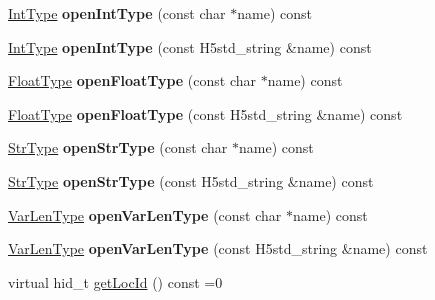 \begin{DoxyCompactItemize}
\item 
\mbox{\label{class_h5_1_1_common_f_g_a8840cb7af2ee07b9957fdfe2e9bb69e6}} 
\hyperlink{class_h5_1_1_int_type}{Int\+Type} {\bfseries open\+Int\+Type} (const char $\ast$name) const
\item 
\mbox{\label{class_h5_1_1_common_f_g_a3b5b0f0cbd4c3c19e1c42ab602c0620c}} 
\hyperlink{class_h5_1_1_int_type}{Int\+Type} {\bfseries open\+Int\+Type} (const H5std\+\_\+string \&name) const
\item 
\mbox{\label{class_h5_1_1_common_f_g_a4ff5671504f7a61a3104a3bdf765a6e4}} 
\hyperlink{class_h5_1_1_float_type}{Float\+Type} {\bfseries open\+Float\+Type} (const char $\ast$name) const
\item 
\mbox{\label{class_h5_1_1_common_f_g_a421f20649d892aaebb9f459ac05f5ef3}} 
\hyperlink{class_h5_1_1_float_type}{Float\+Type} {\bfseries open\+Float\+Type} (const H5std\+\_\+string \&name) const
\item 
\mbox{\label{class_h5_1_1_common_f_g_a399189b9aaaf1de35128c2cdf11dcbb8}} 
\hyperlink{class_h5_1_1_str_type}{Str\+Type} {\bfseries open\+Str\+Type} (const char $\ast$name) const
\item 
\mbox{\label{class_h5_1_1_common_f_g_ac4a7a28353ee69673cbc0746374e271d}} 
\hyperlink{class_h5_1_1_str_type}{Str\+Type} {\bfseries open\+Str\+Type} (const H5std\+\_\+string \&name) const
\item 
\mbox{\label{class_h5_1_1_common_f_g_ac89e5b183b4207da3f997e556ecfd66d}} 
\hyperlink{class_h5_1_1_var_len_type}{Var\+Len\+Type} {\bfseries open\+Var\+Len\+Type} (const char $\ast$name) const
\item 
\mbox{\label{class_h5_1_1_common_f_g_affb3437c69d6249ddb2460d8b1dbc077}} 
\hyperlink{class_h5_1_1_var_len_type}{Var\+Len\+Type} {\bfseries open\+Var\+Len\+Type} (const H5std\+\_\+string \&name) const
\item 
virtual hid\+\_\+t \hyperlink{class_h5_1_1_common_f_g_a28dd053d0fa4ebad7fca2949e65d1987}{get\+Loc\+Id} () const =0
\item 

\end{DoxyCompactItemize}
